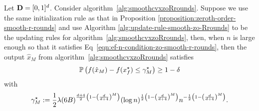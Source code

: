 \begin{corollary}
\label{corollary:zeroth-order-smooth-r-rounds}
Let $\mathbf{D} = [0, 1]^d$. Consider algorithm~\ref{alg:smoothcvxzoRrounds}. 
Suppose we use the same initialization rule as that in Proposition
\ref{proposition:zeroth-order-smooth-r-rounds} and use Algorithm
\ref{alg:update-rule-smooth-zo-Rrounds} to be the updating rules 
for algorithm~\ref{alg:smoothcvxzoRrounds}, then, when $n$ is large enough 
so that it satisfies Eq~\eqref{eqn:ef-n-condition-zo-smooth-r-rounds}, then
the output $\hat{x}_M$ from algorithm~\ref{alg:smoothcvxzoRrounds} satisfies 
\begin{equation*}
\mathbb{P}\left(f(\hat{x}_M) - f(x_f^\star) \leq \gamma_M^\star \right)\geq 1-\delta 
\end{equation*}
with 
\begin{equation*}
\gamma_M^\star := \frac{1}{2} \lambda (6B)^{\frac{d+4}{2} \left(1-\left(\frac{d}{d+4}\right)^M\right)}
		(\log n)^{\frac{1}{2} \left(1 - \left(\frac{d}{d+4}\right)^M\right)}
		n^{-\frac{1}{2} \left(1 - \left(\frac{d}{d+4}\right)^M\right)}.
\end{equation*}
\end{corollary}


